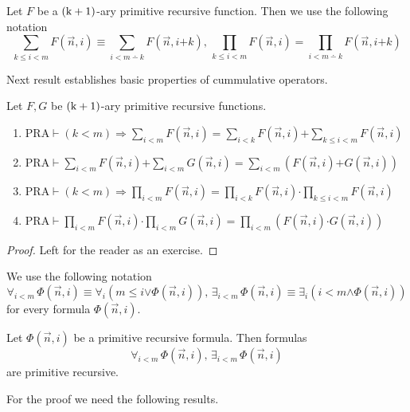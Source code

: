\documentclass[10pt]{amsart}
\newcommand{\mforall}{\boldsymbol{\forall}}
\newcommand{\mexists}{\boldsymbol{\exists}}
\newcommand{\mra}{\boldsymbol{\Rightarrow}}
\newcommand{\mand}{\boldsymbol{\wedge}}
\newcommand{\mor}{\boldsymbol{\vee}}
\newcommand{\mle}{\boldsymbol{<}}
\newcommand{\mleq}{\boldsymbol{\leq}}
\newcommand{\meq}{\boldsymbol{=}}
\newcommand{\mplus}{\boldsymbol{+}}
\newcommand{\mdot}{\boldsymbol{\cdot}}
\begin{document}
\begin{remark}\label{remark:cummulative_operators_with_start_index}
	Let $F$ be a $\rm{(k + 1)}$-ary primitive recursive function. Then we use the following notation
	$$\sum_{k \mleq i \mle m}F(\vec{n},i) \equiv \sum_{i \mle m\dotminus k}F(\vec{n},i \mplus k),\,\prod_{k \mleq i \mle m}F(\vec{n},i) \meq \prod_{i \mle m \dotminus k}F(\vec{n}, i \mplus k)$$
\end{remark}
\noindent
Next result establishes basic properties of cummulative operators.

\begin{fact}\label{fact:basic_properties_of_cummulative_operators}
	Let $F, G$ be $\rm{(k + 1)}$-ary primitive recursive functions.
	\begin{enumerate}[label=\emph{\textbf{(\arabic*)}}, leftmargin=3.0em]
		\item $\mathrm{PRA}\vdash (k \mle m) \mra \sum_{i \mle m}F(\vec{n},i) \meq \sum_{i \mle k}F(\vec{n},i) \mplus \sum_{k \mleq i \mle m}F(\vec{n},i)$
		\item $\mathrm{PRA}\vdash \sum_{i \mle m}F(\vec{n},i) \mplus \sum_{i \mle m}G(\vec{n},i) \meq \sum_{i \mle m}\left(F(\vec{n},i) \mplus G(\vec{n},i)\right)$
		\item $\mathrm{PRA}\vdash (k \mle m) \mra \prod_{i \mle m}F(\vec{n},i) \meq \prod_{i \mle k}F(\vec{n},i) \mdot \prod_{k \mleq i \mle m}F(\vec{n},i)$
		\item $\mathrm{PRA}\vdash \prod_{i \mle m}F(\vec{n},i) \mdot \prod_{i \mle m}G(\vec{n},i) \meq \prod_{i \mle m}\left(F(\vec{n},i) \mdot G(\vec{n},i)\right)$
	\end{enumerate}
\end{fact}
\begin{proof}
	Left for the reader as an exercise.
\end{proof}

\begin{remark}\label{remark:bounded_quantifiers}
	We use the following notation
	$$\mforall_{i \mle m}\,\Phi(\vec{n},i) \equiv \mforall_i\left(m \mleq i \mor \Phi(\vec{n},i)\right),\,\mexists_{i \mle m}\,\Phi(\vec{n},i) \equiv \mexists_i\left(i \mle m \mand \Phi(\vec{n},i)\right)$$
	for every formula $\Phi(\vec{n},i)$.
\end{remark}

\begin{theorem}\label{theorem:primitive_recursive_formulas_are_closed_under_bounded_quantifiers}
	Let $\Phi(\vec{n},i)$ be a primitive recursive formula. Then formulas
	$$\mforall_{i \mle m}\,\Phi(\vec{n},i),\,\mexists_{i \mle m}\,\Phi(\vec{n},i)$$
	are primitive recursive.
\end{theorem}
\noindent
For the proof we need the following results.
\end{document}
